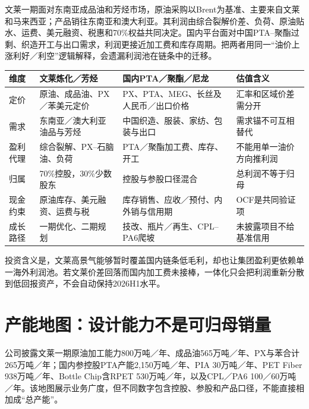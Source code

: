 文莱一期面对东南亚成品油和芳烃市场，原油采购以Brent为基准、主要来自文莱和马来西亚；产品销往东南亚和澳大利亚。其利润由综合裂解价差、负荷、原油贴水、运费、美元融资、税惠和70\%权益共同决定。国内平台面对中国PTA--聚酯过剩、织造开工与出口需求，利润更接近加工费和库存周期。把两者用同一“油价上涨利好／利空”逻辑解释，会遗漏利润池在链条中的迁移。

\begin{exhibitbox}[两套经济模型的差异]
\small
\noindent\begin{tabularx}{\textwidth}{L{2.35cm}L{3.7cm}L{3.7cm}X}
\toprule
\textbf{维度} & \textbf{文莱炼化／芳烃} & \textbf{国内PTA／聚酯／尼龙} & \textbf{估值含义} \\
\midrule
定价 & 原油、成品油、PX／苯美元定价 & PX、PTA、MEG、长丝及人民币／出口价格 & 汇率和区域价差需分开 \\
需求 & 东南亚／澳大利亚油品与芳烃 & 中国织造、服装、家纺、包装与出口 & 需求锚不可互相替代 \\
盈利代理 & 综合裂解、PX--石脑油、负荷 & PTA／聚酯加工费、库存、开工 & 不能用单一油价方向推利润 \\
归属 & 70\%控股，30\%少数股东 & 控股与参股口径混合 & 总利润不等于归母 \\
现金约束 & 原油库存、美元融资、运费与税 & 库存销售、应收／预付、内外销与信用期 & OCF是共同验证项 \\
成长路径 & 一期优化、二期规划 & 技改、瓶片／再生、CPL--PA6爬坡 & 未披露项目不给基准信用 \\
\bottomrule
\end{tabularx}
\end{exhibitbox}

投资含义是，文莱高景气能够暂时覆盖国内链条低毛利，却也让集团盈利更依赖单一海外利润池。若文莱价差回落而国内加工费未接棒，一体化只会把利润重新分散到低回报资产，不会自动保持2026H1水平。

\section{产能地图：设计能力不是可归母销量}

公司披露文莱一期原油加工能力800万吨／年、成品油565万吨／年、PX与苯合计265万吨／年；国内参控股PTA产能2,150万吨／年、PIA 30万吨／年、PET Fiber 938万吨／年、Bottle Chip含RPET 530万吨／年，以及CPL／PA6 100／60万吨／年。该地图展示业务广度，但不同数字包含控股、参股和产品口径，不能直接相加成“总产能”。


